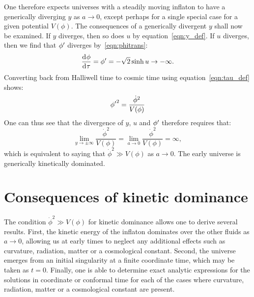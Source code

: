 One therefore expects universes with a steadily moving inflaton to have a generically diverging \(y\) as \(a\to0\), except perhaps for a single special case for a given potential \(V(\phi)\).  The consequences of a generically divergent \(y\) shall now be examined.  If \(y\) diverges, then so does \(u\) by equation~\eqref{eqn:y_def}. If \(u\) diverges, then we find that \({{\phi}^\prime}\) diverges by~\eqref{eqn:phitrans}:
%
\begin{equation}
  \frac{\operatorname{d}^{}\!{\phi}}{\operatorname{d}^{}\!{\tau}}={{\phi}^\prime} 
  = 
  -\sqrt{2}\sinh u\rightarrow -\infty.
\end{equation}
%
Converting back from Halliwell time to cosmic time using equation~\eqref{eqn:tau_def} shows:
%
\begin{equation}
  {{\phi}^\prime}^2 
  = 
  \frac{\dot{\phi}^2}{V(\phi)}
\end{equation}
%
One can thus see that the divergence of \(y\), \(u\) and \({{\phi}^\prime}\) therefore requires that:
%
\begin{equation}
  \lim\limits_{y\to\pm\infty} \frac{\dot\phi^2}{V(\phi)}
  =
  \lim\limits_{a\to 0} \frac{\dot\phi^2}{V(\phi)} = \infty,
  \label{eqn:kdfinal}
\end{equation}
%
which is equivalent to saying that \(\dot{\phi}^2\gg V(\phi)\) as
\(a\to0\). The early universe is generically kinetically dominated.

\section{Consequences of kinetic dominance}
\label{sec:consequences_of_kinetic_dominance}

The condition \(\dot\phi^2\gg V(\phi)\) for kinetic dominance allows one to derive several results. First, the kinetic energy of the inflaton dominates over the other fluids as \(a\to 0\), allowing us at early times to neglect any additional effects such as curvature, radiation, matter or a cosmological constant. Second, the universe emerges from an initial singularity at a finite coordinate time, which may be taken as \(t=0\). Finally, one is able to determine exact analytic expressions for the solutions in coordinate or conformal time for each of the cases where curvature, radiation, matter or a cosmological constant are present.


